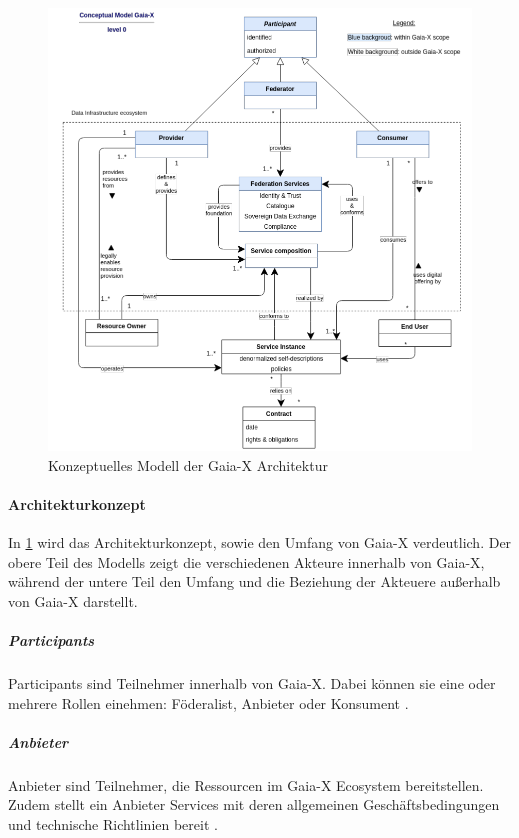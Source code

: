 \begin{figure}[h]
  \centering
  \includegraphics[width=\textwidth]{gfx/chapters/2_grundlagen/gaia-x-architecture.png}
  \caption{Konzeptuelles Modell der Gaia-X Architektur}
  \label{fig:gaia-x-concept-architecture}
\end{figure}

\paragraph{Architekturkonzept}
In \ref{fig:gaia-x-concept-architecture} wird das Architekturkonzept, sowie den Umfang von Gaia-X verdeutlich.
Der obere Teil des Modells zeigt die verschiedenen Akteure innerhalb von Gaia-X, während der
untere Teil den Umfang und die Beziehung der Akteuere außerhalb von Gaia-X darstellt.

\subparagraph{Participants}
Participants sind Teilnehmer innerhalb von Gaia-X. 
Dabei können sie eine oder mehrere Rollen einehmen: Föderalist, Anbieter oder Konsument \cite{GaiaXArchitecture2021}.

\subparagraph{Anbieter}
Anbieter sind Teilnehmer, die Ressourcen im Gaia-X Ecosystem bereitstellen. Zudem stellt
ein Anbieter Services mit deren allgemeinen Geschäftsbedingungen und technische Richtlinien bereit \cite{GaiaXArchitecture2021}.

